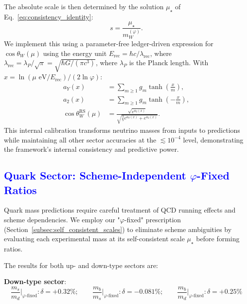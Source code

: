 \documentclass[%
amsmath,amssymb,
aps,
prb,
floatfix, showkeys, 10pt,
]{revtex4-2}
\newcommand{\modif}[1]{\textcolor{blue}{#1}}
\begin{document}
The absolute scale is then determined by the solution $\mu_\star$ of Eq.~\eqref{eq:consistency_identity}:
\begin{equation}
s = \frac{\mu_\star}{m_W^{(\varphi)}}.
\label{eq:internal_scale}
\end{equation}
We implement this using a parameter-free ledger-driven expression for $\cos\theta_W(\mu)$
using the energy unit $E_{\text{rec}} = \hbar c/\lambda_{\text{rec}}$,
where $\lambda_{\text{rec}} = \lambda_P/ \sqrt{\pi} = \sqrt{\hbar G/(\pi c^3)}$, where $\lambda_P$ is the Planck length.
With $x = \ln(\mu \text{ eV}/E_{\text{rec}})/(2\ln\varphi)$:
\begin{align}
a_Y(x) &= \sum_{m \geq 1} g_m \tanh\left(\frac{x}{m}\right), \\
a_2(x) &= \sum_{m \geq 1} g_m \tanh\left(-\frac{x}{m}\right), \\
\cos\theta_W^{\text{RS}}(\mu) &= \frac{\sqrt{e^{a_2(x)}}}{\sqrt{\frac{3}{5}e^{a_Y(x)} + e^{a_2(x)}}}.
\end{align}
This internal calibration transforms neutrino masses from inputs to predictions while maintaining all other sector accuracies at the $\lesssim 10^{-4}$ level, demonstrating the framework's internal consistency and predictive power.
















{\modif{  \subsection{Quark Sector: Scheme-Independent $\varphi$-Fixed Ratios}
\label{subsec:quark_results}  }}
Quark mass predictions require careful treatment of QCD running effects and scheme dependencies. We employ our "$\varphi$-fixed" prescription (Section~\ref{subsec:self_consistent_scales}) to eliminate scheme ambiguities by evaluating each experimental mass at its self-consistent scale $\mu_\star$ before forming ratios.

The results for both up- and down-type sectors are:

\textbf{Down-type sector}:
\begin{equation}
\frac{m_s}{m_d}\Big|_{\varphi\text{-fixed}} : \delta = +0.32\% ;  \quad  \quad
\frac{m_b}{m_s}\Big|_{\varphi\text{-fixed}} : \delta = -0.081\%;  \quad  \quad
\frac{m_b}{m_d}\Big|_{\varphi\text{-fixed}} : \delta = +0.25\%
\end{equation}
\end{document}
